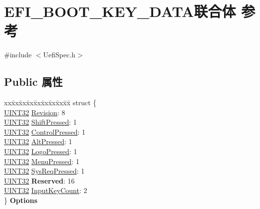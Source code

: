 \hypertarget{union_e_f_i___b_o_o_t___k_e_y___d_a_t_a}{}\section{E\+F\+I\+\_\+\+B\+O\+O\+T\+\_\+\+K\+E\+Y\+\_\+\+D\+A\+T\+A联合体 参考}
\label{union_e_f_i___b_o_o_t___k_e_y___d_a_t_a}


{\ttfamily \#include $<$Uefi\+Spec.\+h$>$}

\subsection*{Public 属性}
\begin{DoxyCompactItemize}
\item 
\mbox{\label{union_e_f_i___b_o_o_t___k_e_y___d_a_t_a_a39dc94e8e2bb6db757b39099c18f5133}} 
\begin{tabbing}
xx\=xx\=xx\=xx\=xx\=xx\=xx\=xx\=xx\=\kill
struct \{\\
\>\hyperlink{_processor_bind_8h_ae1e6edbbc26d6fbc71a90190d0266018}{UINT32} \hyperlink{union_e_f_i___b_o_o_t___k_e_y___d_a_t_a_a66454cd27a43382c906e908be547d229}{Revision}: 8\\
\>\hyperlink{_processor_bind_8h_ae1e6edbbc26d6fbc71a90190d0266018}{UINT32} \hyperlink{union_e_f_i___b_o_o_t___k_e_y___d_a_t_a_a983682178cf96570be09eb23e04187b7}{ShiftPressed}: 1\\
\>\hyperlink{_processor_bind_8h_ae1e6edbbc26d6fbc71a90190d0266018}{UINT32} \hyperlink{union_e_f_i___b_o_o_t___k_e_y___d_a_t_a_a03fb2a51be42ee8e4595839614cad882}{ControlPressed}: 1\\
\>\hyperlink{_processor_bind_8h_ae1e6edbbc26d6fbc71a90190d0266018}{UINT32} \hyperlink{union_e_f_i___b_o_o_t___k_e_y___d_a_t_a_aa82e45e248810ec394eab8d7e6269124}{AltPressed}: 1\\
\>\hyperlink{_processor_bind_8h_ae1e6edbbc26d6fbc71a90190d0266018}{UINT32} \hyperlink{union_e_f_i___b_o_o_t___k_e_y___d_a_t_a_a3c66a49d7b2b7c35d3865d920a980b21}{LogoPressed}: 1\\
\>\hyperlink{_processor_bind_8h_ae1e6edbbc26d6fbc71a90190d0266018}{UINT32} \hyperlink{union_e_f_i___b_o_o_t___k_e_y___d_a_t_a_a3b6504d350a3ac5099a4a791090a847b}{MenuPressed}: 1\\
\>\hyperlink{_processor_bind_8h_ae1e6edbbc26d6fbc71a90190d0266018}{UINT32} \hyperlink{union_e_f_i___b_o_o_t___k_e_y___d_a_t_a_a22f37d7cbc44c638be3cd387f572de22}{SysReqPressed}: 1\\
\>\hyperlink{_processor_bind_8h_ae1e6edbbc26d6fbc71a90190d0266018}{UINT32} {\bfseries Reserved}: 16\\
\>\hyperlink{_processor_bind_8h_ae1e6edbbc26d6fbc71a90190d0266018}{UINT32} \hyperlink{union_e_f_i___b_o_o_t___k_e_y___d_a_t_a_a67d50157b127d202a1ced0f7b054cf84}{InputKeyCount}: 2\\
\} {\bfseries Options}\\


\end{tabbing}
\end{DoxyCompactItemize}
